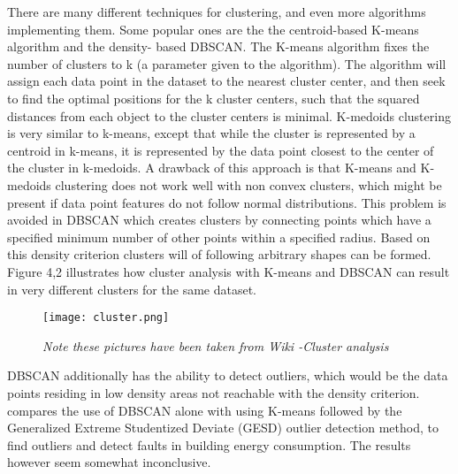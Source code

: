 There are many different techniques for clustering, and even more algorithms implementing them. Some popular ones are the the centroid-based K-means algorithm and the density- based DBSCAN. The K-means algorithm fixes the number of clusters to k (a parameter given to the algorithm). The algorithm will assign each data point in the dataset to the nearest cluster center, and then seek to find the optimal positions for the k cluster centers, such that the squared distances from each object to the cluster centers is minimal. K-medoids clustering is very similar to k-means, except that while the cluster is represented by a centroid in k-means, it is represented by the data point closest to the center of the cluster in k-medoids. A drawback of this approach is that K-means and K-medoids clustering does not work well with non convex clusters, which might be present if data point features do not follow normal distributions. This problem is avoided in DBSCAN which creates clusters by connecting points which have a specified minimum number of other points within a specified radius. Based on this density criterion clusters will of following arbitrary shapes can be formed. Figure 4,2 illustrates how cluster analysis with K-means and DBSCAN can result in very different clusters for the same dataset.
\begin{figure}
\texttt{[image: cluster.png]}
\caption{\emph{Note these pictures have been taken from Wiki -Cluster analysis}}
\end{figure}
DBSCAN additionally has the ability to detect outliers, which would be the data points residing in low density areas not reachable with the density criterion. \cite{faultdetec3} compares the use of DBSCAN alone with using K-means followed by the Generalized Extreme Studentized Deviate (GESD) outlier detection method, to find  outliers and detect faults in building energy consumption. The results however seem somewhat inconclusive. 
\newline

